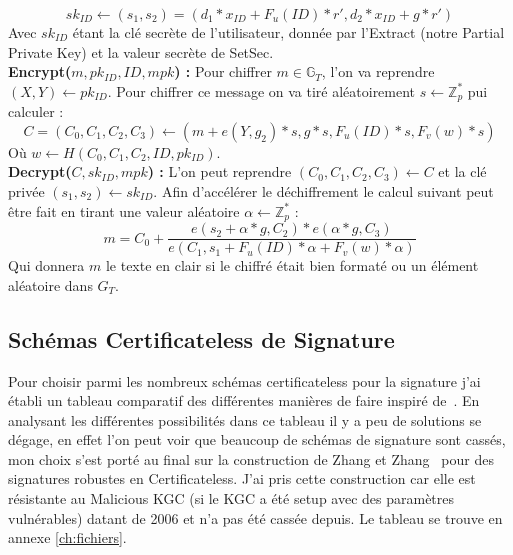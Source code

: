 \[sk_{ID} \leftarrow (s_1, s_2) = (d_1*x_{ID} + F_u(ID)*r', d_2*x_{ID} + g*r')\]
Avec $sk_{ID}$ étant la clé secrète de l'utilisateur, donnée par l'Extract (notre Partial Private Key) et la valeur secrète de SetSec.\\
\textbf{Encrypt($m, pk_{ID}, ID, mpk$) :} Pour chiffrer $m \in \mathbb{G}_T$, l'on va reprendre $(X,Y) \leftarrow pk_{ID}$. Pour chiffrer ce message on va tiré aléatoirement $s \leftarrow \mathbb{Z}_p^*$ pui calculer : 
\[C = (C_0, C_1, C_2, C_3) \leftarrow (m + e(Y, g_2)*s, g*s,F_u(ID)*s, F_v(w)*s )\]
Où $w \leftarrow H(C_0,C_1, C_2, ID, pk_{ID})$.\\
\textbf{Decrypt($C, sk_{ID}, mpk$) :} L'on peut reprendre $(C_0,C_1,C_2,C_3) \leftarrow C$ et la clé privée $(s_1, s_2) \leftarrow sk_{ID}$. Afin d'accélérer le déchiffrement le calcul suivant peut être fait en tirant une valeur aléatoire $\alpha \leftarrow \mathbb{Z}_p^*$ :
\[m = C_0 + \frac{e(s_2 + \alpha*g, C_2 )*e(\alpha*g, C_3)}{e(C_1, s_1 + F_u(ID)*\alpha + F_v(w)*\alpha)}\]
Qui donnera $m$ le texte en clair si le chiffré était bien formaté ou un élément aléatoire dans $G_T$.
\subsection{Schémas Certificateless de Signature}
Pour choisir parmi les nombreux schémas certificateless pour la signature j'ai établi un tableau comparatif des différentes manières de faire inspiré de~\cite{bookIntroCertificateless}. En analysant les différentes possibilités dans ce tableau il y a peu de solutions se dégage, en effet l'on peut voir que beaucoup de schémas de signature sont cassés, mon choix s'est porté au final sur la construction de Zhang et Zhang~\cite{DBLP:conf/acns/ZhangWXF06} pour des signatures robustes en Certificateless. J'ai pris cette construction car elle est résistante au Malicious KGC (si le KGC a été setup avec des paramètres vulnérables) datant de 2006 et n'a pas été cassée depuis. Le tableau se trouve en annexe \ref{ch:fichiers}.
